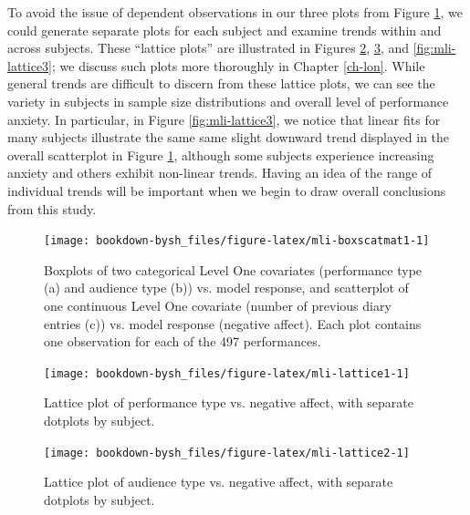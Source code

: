 \documentclass[
]{krantz}
\begin{document}
To avoid the issue of dependent observations in our three plots from Figure \ref{fig:mli-boxscatmat1}, we could generate separate plots for each subject and examine trends within and across subjects. These ``lattice plots''  are illustrated in Figures \ref{fig:mli-lattice1}, \ref{fig:mli-lattice2}, and \ref{fig:mli-lattice3}; we discuss such plots more thoroughly in Chapter \ref{ch-lon}. While general trends are difficult to discern from these lattice plots, we can see the variety in subjects in sample size distributions and overall level of performance anxiety. In particular, in Figure \ref{fig:mli-lattice3}, we notice that linear fits for many subjects illustrate the same same slight downward trend displayed in the overall scatterplot in Figure \ref{fig:mli-boxscatmat1}, although some subjects experience increasing anxiety and others exhibit non-linear trends. Having an idea of the range of individual trends will be important when we begin to draw overall conclusions from this study.

\begin{figure}

{\centering \texttt{[image: bookdown-bysh\_files/figure-latex/mli-boxscatmat1-1]} 

}

\caption{Boxplots of two categorical Level One covariates (performance type (a) and audience type (b)) vs. model response, and scatterplot of one continuous Level One covariate (number of previous diary entries (c)) vs. model response (negative affect).  Each plot contains one observation for each of the 497 performances.}\label{fig:mli-boxscatmat1}
\end{figure}

\begin{figure}

{\centering \texttt{[image: bookdown-bysh\_files/figure-latex/mli-lattice1-1]} 

}

\caption{Lattice plot of performance type vs. negative affect, with separate dotplots by subject.}\label{fig:mli-lattice1}
\end{figure}

\begin{figure}

{\centering \texttt{[image: bookdown-bysh\_files/figure-latex/mli-lattice2-1]} 

}

\caption{Lattice plot of audience type vs. negative affect, with separate dotplots by subject.}\label{fig:mli-lattice2}
\end{figure}
\end{document}
